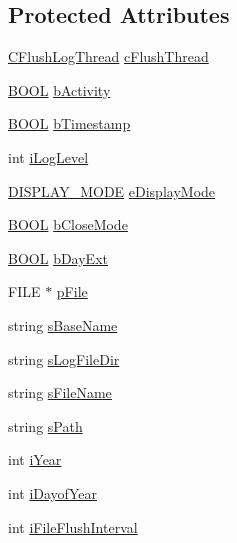 \subsection*{\-Protected \-Attributes}
\begin{DoxyCompactItemize}
\item 
\hyperlink{class_c_flush_log_thread}{\-C\-Flush\-Log\-Thread} \hyperlink{class_c_logging_a29717e304d66d2cedad282e089ec9af6}{c\-Flush\-Thread}
\item 
\hyperlink{_cpclient_8h_a3be13892ae7076009afcf121347dd319}{\-B\-O\-O\-L} \hyperlink{class_c_logging_a63e6147a19d0da756991f793fe08554a}{b\-Activity}
\item 
\hyperlink{_cpclient_8h_a3be13892ae7076009afcf121347dd319}{\-B\-O\-O\-L} \hyperlink{class_c_logging_a8d0da938d9a52c21b274afcc01770723}{b\-Timestamp}
\item 
int \hyperlink{class_c_logging_a672993d47c795a8ab994447f926f4159}{i\-Log\-Level}
\item 
\hyperlink{class_c_logging_ac88f172cb4d0a2643a15fe21d4d20910}{\-D\-I\-S\-P\-L\-A\-Y\-\_\-\-M\-O\-D\-E} \hyperlink{class_c_logging_af7ae839aaa5767ec1a198917ace897f2}{e\-Display\-Mode}
\item 
\hyperlink{_cpclient_8h_a3be13892ae7076009afcf121347dd319}{\-B\-O\-O\-L} \hyperlink{class_c_logging_ac997558d1932184c730d1c7b5ad37a25}{b\-Close\-Mode}
\item 
\hyperlink{_cpclient_8h_a3be13892ae7076009afcf121347dd319}{\-B\-O\-O\-L} \hyperlink{class_c_logging_ad4ba27430d63110cca48140c87b7862a}{b\-Day\-Ext}
\item 
\-F\-I\-L\-E $\ast$ \hyperlink{class_c_logging_a610bd219492305abbaab8d9e250ff5f8}{p\-File}
\item 
string \hyperlink{class_c_logging_ab910ec9b836bfa113942632969539b41}{s\-Base\-Name}
\item 
string \hyperlink{class_c_logging_a98be76d6204726bd5aae8cdf4cb744a0}{s\-Log\-File\-Dir}
\item 
string \hyperlink{class_c_logging_afac93962c6d3566015c5175ec002ed11}{s\-File\-Name}
\item 
string \hyperlink{class_c_logging_a128a9f601af04f28b1934212215427f8}{s\-Path}
\item 
int \hyperlink{class_c_logging_a6ebd771a621ebcf2a621f99de27134bf}{i\-Year}
\item 
int \hyperlink{class_c_logging_a3d64ed55288a13595ba440fb6356e7c2}{i\-Dayof\-Year}
\item 
int \hyperlink{class_c_logging_adf8e82a334654b6875f81decf6c0306b}{i\-File\-Flush\-Interval}

\end{DoxyCompactItemize}
